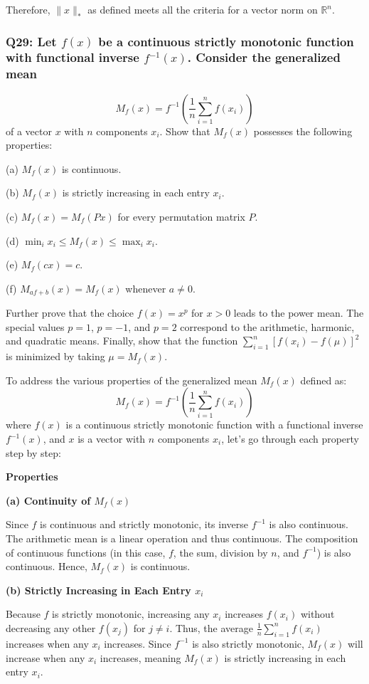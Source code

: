 \documentclass[8pt]{article}
\begin{document}
Therefore, \(\|x\|_*\) as defined meets all the criteria for a vector norm on \(\mathbb{R}^n\).

\subsubsection*{Q29: Let \( f(x) \) be a continuous strictly monotonic function with functional inverse \( f^{-1}(x) \). Consider the generalized mean}
\[
M_f(x) = f^{-1} \left( \frac{1}{n} \sum_{i=1}^n f(x_i) \right)
\]
of a vector \( x \) with \( n \) components \( x_i \). Show that \( M_f(x) \) possesses the following properties:

(a) \( M_f(x) \) is continuous.

(b) \( M_f(x) \) is strictly increasing in each entry \( x_i \).

(c) \( M_f(x) = M_f(Px) \) for every permutation matrix \( P \).

(d) \( \min_i x_i \leq M_f(x) \leq \max_i x_i \).

(e) \( M_f(cx) = c \).

(f) \( M_{af+b}(x) = M_f(x) \) whenever \( a \neq 0 \).

Further prove that the choice \( f(x) = x^p \) for \( x > 0 \) leads to the power mean. The special values \( p = 1 \), \( p = -1 \), and \( p = 2 \) correspond to the arithmetic, harmonic, and quadratic means. Finally, show that the function \( \sum_{i=1}^n [f(x_i) - f(\mu)]^2 \) is minimized by taking \( \mu = M_f(x) \).

To address the various properties of the generalized mean \( M_f(x) \) defined as:
\[
M_f(x) = f^{-1} \left( \frac{1}{n} \sum_{i=1}^n f(x_i) \right)
\]
where \( f(x) \) is a continuous strictly monotonic function with a functional inverse \( f^{-1}(x) \), and \( x \) is a vector with \( n \) components \( x_i \), let's go through each property step by step:

\textbf{Properties}

\textbf{(a) Continuity of \( M_f(x) \)}

Since \( f \) is continuous and strictly monotonic, its inverse \( f^{-1} \) is also continuous. The arithmetic mean is a linear operation and thus continuous. The composition of continuous functions (in this case, \( f \), the sum, division by \( n \), and \( f^{-1} \)) is also continuous. Hence, \( M_f(x) \) is continuous.

\textbf{(b) Strictly Increasing in Each Entry \( x_i \)}

Because \( f \) is strictly monotonic, increasing any \( x_i \) increases \( f(x_i) \) without decreasing any other \( f(x_j) \) for \( j \neq i \). Thus, the average \( \frac{1}{n} \sum_{i=1}^n f(x_i) \) increases when any \( x_i \) increases. Since \( f^{-1} \) is also strictly monotonic, \( M_f(x) \) will increase when any \( x_i \) increases, meaning \( M_f(x) \) is strictly increasing in each entry \( x_i \).
\end{document}
